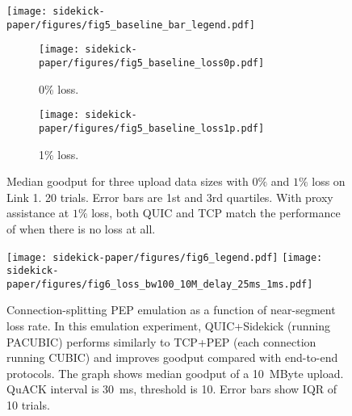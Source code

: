 \begin{figure}[t]
\centering
\texttt{[image: sidekick-paper/figures/fig5\_baseline\_bar\_legend.pdf]}
\begin{subfigure}{0.49\linewidth}
	\texttt{[image: sidekick-paper/figures/fig5\_baseline\_loss0p.pdf]}
	\caption{0\% loss.}
	\label{fig:baseline-bar:loss0p}
\end{subfigure}
\begin{subfigure}{0.49\linewidth}
	\texttt{[image: sidekick-paper/figures/fig5\_baseline\_loss1p.pdf]}
	\caption{1\% loss.}
	\label{fig:baseline-bar:loss1p}
\end{subfigure}
\caption{Median goodput for three upload data sizes with $0\%$ and $1\%$ loss on
Link 1. 20 trials. Error bars are 1st and 3rd quartiles.
With proxy assistance at $1\%$
loss, both QUIC and TCP match the performance of when there is no loss at all.
}
\label{fig:baseline-bar}
\end{figure}

\begin{figure}[t]
\centering
\texttt{[image: sidekick-paper/figures/fig6\_legend.pdf]}
\texttt{[image: sidekick-paper/figures/fig6\_loss\_bw100\_10M\_delay\_25ms\_1ms.pdf]}
\caption{Connection-splitting PEP emulation as a function of near-segment
	loss rate. In this emulation experiment, QUIC+Sidekick (running PACUBIC)
  performs similarly to TCP+PEP (each connection running CUBIC)
  and improves goodput compared with end-to-end protocols. The graph shows
  median goodput of a 10~MByte upload. QuACK interval is 30~ms, threshold
is 10. Error bars show IQR of 10 trials.
}
\label{fig:loss-vs-tput}
\end{figure}
